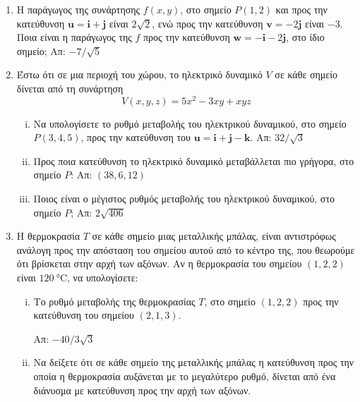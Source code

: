 \begin{enumerate}
  \item Η παράγωγος της συνάρτησης $ f(x,y) $, στο σημείο $ P(1,2) $ και προς την 
    κατεύθυνση $ \mathbf{u} = \mathbf{i} + \mathbf{j} $ είναι $ 2 \sqrt{2} $, ενώ 
    προς την κατεύθυνση $ \mathbf{v} = -2 \mathbf{j} $ είναι $ -3 $. Ποια είναι 
    η παράγωγος της $f$ προς την κατεύθυνση $ \mathbf{w} = - \mathbf{i}- 2\mathbf{j} $, 
    στο ίδιο σημείο; \hfill Απ: $ -7/ \sqrt{5} $

  \item Έστω ότι σε μια περιοχή του χώρου, το ηλεκτρικό δυναμικό $V$ σε κάθε σημείο 
    δίνεται από τη συνάρτηση \[ V(x,y,z) = 5x^{2}-3xy+xyz \] 
    \begin{enumerate}[i) ]
      \item Να υπολογίσετε το ρυθμό μεταβολής του ηλεκτρικού δυναμικού, στο σημείο 
        $ P(3,4,5) $, προς την κατεύθυνση του $ \mathbf{u} = \mathbf{i} + \mathbf{j} - 
        \mathbf{k} $. \hfill Απ: $ 32 / \sqrt{3} $  

      \item Προς ποια κατεύθυνση το ηλεκτρικό δυναμικό μεταβάλλεται πιο γρήγορα, στο 
        σημείο $ P $: \hfill Απ: $ (38,6,12) $ 
      \item Ποιος είναι ο μέγιστος ρυθμός μεταβολής του ηλεκτρικού δυναμικού, στο σημείο 
        $ P $; \hfill Απ: $ 2 \sqrt{406} $ 
    \end{enumerate}

  \item Η θερμοκρασία $T$ σε κάθε σημείο μιας μεταλλικής μπάλας, είναι αντιστρόφως 
    ανάλογη προς την απόσταση του σημείου αυτού από το κέντρο της, που θεωρούμε ότι 
    βρίσκεται στην αρχή των αξόνων. Αν η θερμοκρασία του σημείου $ (1,2,2) $ είναι 
    $ \SI{120}{\celsius} $, να υπολογίσετε:
    \begin{enumerate}[i)]
      \item Το ρυθμό μεταβολής της θερμοκρασίας $T$, στο σημείο $ (1,2,2) $ προς την 
        κατεύθυνση του σημείου $ (2,1,3) $. 

        \hfill Απ: $ - 40 /3 \sqrt{3} $ 
      \item Να δείξετε ότι σε κάθε σημείο της μεταλλικής μπάλας η κατεύθυνση προς την
        οποία η θερμοκρασία αυξάνεται με το μεγαλύτερο ρυθμό, δίνεται από ένα διάνυσμα 
        με κατεύθυνση προς την αρχή των αξόνων.
    \end{enumerate}
\end{enumerate}



